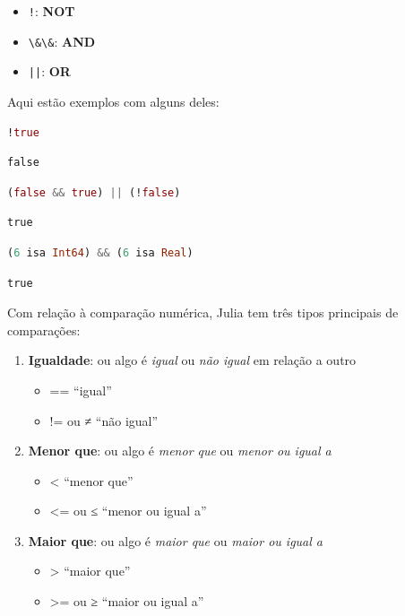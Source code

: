 \documentclass[
  notoc %
]{tufte-book}
\providecommand{\tightlist}{%
  \setlength{\itemsep}{0pt}\setlength{\parskip}{0pt}
}
\newcommand{\passthrough}[1]{#1}
\begin{document}
\begin{itemize}
\tightlist
\item
  \passthrough{\lstinline"!"}: \textbf{NOT}
\item
  \passthrough{\lstinline!\&\&!}: \textbf{AND}
\item
  \passthrough{\lstinline!||!}: \textbf{OR}
\end{itemize}

Aqui estão exemplos com alguns deles:

\begin{lstlisting}[language=Julia]
!true
\end{lstlisting}

\begin{lstlisting}[language=Output]
false
\end{lstlisting}

\begin{lstlisting}[language=Julia]
(false && true) || (!false)
\end{lstlisting}

\begin{lstlisting}[language=Output]
true
\end{lstlisting}

\begin{lstlisting}[language=Julia]
(6 isa Int64) && (6 isa Real)
\end{lstlisting}

\begin{lstlisting}[language=Output]
true
\end{lstlisting}

Com relação à comparação numérica, Julia tem três tipos principais de
comparações:

\begin{enumerate}
\def\labelenumi{\arabic{enumi}.}
\tightlist
\item
  \textbf{Igualdade}: ou algo é \emph{igual} ou \emph{não igual} em
  relação a outro

  \begin{itemize}
  \tightlist
  \item
    == ``igual''
  \item
    != ou ≠ ``não igual''
  \end{itemize}
\item
  \textbf{Menor que}: ou algo é \emph{menor que} ou \emph{menor ou igual
  a}

  \begin{itemize}
  \tightlist
  \item
    \textless{} ``menor que''
  \item
    \textless= ou ≤ ``menor ou igual a''
  \end{itemize}
\item
  \textbf{Maior que}: ou algo é \emph{maior que} ou \emph{maior ou igual
  a}

  \begin{itemize}
  \tightlist
  \item
    \textgreater{} ``maior que''
  \item
    \textgreater= ou ≥ ``maior ou igual a''
  \end{itemize}
\end{enumerate}
\end{document}
